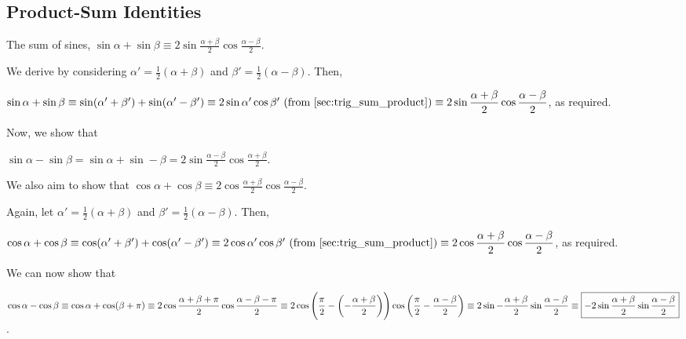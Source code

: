 \documentclass[a4paper,11pt]{article}
\begin{document}
    \subsection{Product-Sum Identities}


    The sum of sines, $\displaystyle \boxed{\sin \alpha + \sin \beta \equiv
        2 \sin \frac{\alpha + \beta}2 \cos \frac{\alpha - \beta}2}$.

    We derive by considering $\alpha' = \frac 12 (\alpha + \beta)$ and
    $\beta' = \frac 12 (\alpha - \beta)$. Then,

    $\sin \alpha + \sin \beta \equiv
     \sin(\alpha' + \beta') + \sin(\alpha' - \beta') \equiv
     2\sin \alpha' \cos \beta'\ \text{(from \ref{sec:trig_sum_product})}
     \\\\\equiv
    \displaystyle
        2 \sin \frac{\alpha + \beta}2 \cos \frac{\alpha - \beta}2$, as required.

    Now, we show that

    $\displaystyle \boxed{\sin \alpha - \sin \beta =
        \sin \alpha + \sin -\beta =
        2 \sin \frac{\alpha - \beta} 2 \cos\frac{\alpha + \beta} 2}$.

    We also aim to show that
    $\displaystyle \boxed{\cos \alpha + \cos \beta \equiv
        2 \cos\frac{\alpha + \beta} 2 \cos \frac{\alpha - \beta} 2}$.

    Again, let $\alpha' = \frac 12 (\alpha + \beta)$ and
    $\beta' = \frac 12 (\alpha - \beta)$. Then,

    $\cos \alpha + \cos \beta \equiv
     \cos(\alpha' + \beta') + \cos(\alpha' - \beta') \equiv
     2\cos \alpha' \cos \beta'\ \text{(from \ref{sec:trig_sum_product})}
     \\\\\equiv
     \displaystyle
        2 \cos\frac{\alpha + \beta} 2 \cos \frac{\alpha - \beta} 2$,
    as required.

    We can now show that

    $\displaystyle \cos \alpha - \cos \beta \equiv
     \cos \alpha + \cos (\beta + \pi)  \equiv
     2 \cos \frac{\alpha + \beta + \pi} 2 \cos \frac {\alpha - \beta - \pi} 2
     \\\equiv
     2 \cos \left(\frac \pi 2 - \left(-\frac{\alpha + \beta} 2\right)\right)
       \cos \left(\frac \pi 2 - \frac{\alpha - \beta} 2 \right) \equiv
     2 \sin -\frac{\alpha + \beta} 2 \sin \frac{\alpha - \beta} 2 \\\\\equiv
     \boxed{-2 \sin \frac{\alpha + \beta} 2 \sin \frac{\alpha - \beta} 2}$.
\end{document}
